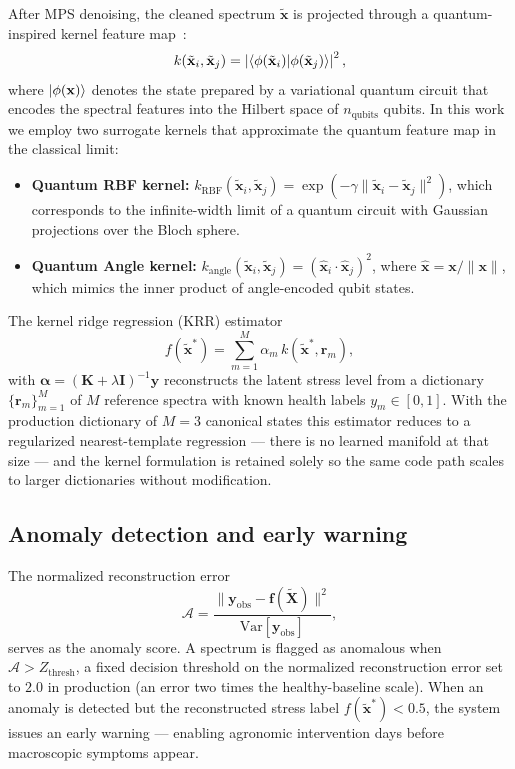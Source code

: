 \documentclass[11pt,a4paper]{article}
\begin{document}
After MPS denoising, the cleaned spectrum $\tilde{\mathbf{x}}$ is projected through a quantum-inspired kernel feature map~\cite{Havlicek2019}:
\begin{equation}\label{eq:SI_quantum_kernel}
k(\tilde{\mathbf{x}}_i, \tilde{\mathbf{x}}_j) = \left| \braket{\phi(\tilde{\mathbf{x}}_i)}{\phi(\tilde{\mathbf{x}}_j)} \right|^2,
\end{equation}
where $\ket{\phi(\mathbf{x})}$ denotes the state prepared by a variational quantum circuit that encodes the spectral features into the Hilbert space of $n_{\mathrm{qubits}}$ qubits. In this work we employ two surrogate kernels that approximate the quantum feature map in the classical limit:
\begin{itemize}
\item \textbf{Quantum RBF kernel:} $k_{\mathrm{RBF}}(\tilde{\mathbf{x}}_i, \tilde{\mathbf{x}}_j) = \exp(-\gamma \|\tilde{\mathbf{x}}_i - \tilde{\mathbf{x}}_j\|^2)$, which corresponds to the infinite-width limit of a quantum circuit with Gaussian projections over the Bloch sphere.
\item \textbf{Quantum Angle kernel:} $k_{\mathrm{angle}}(\tilde{\mathbf{x}}_i, \tilde{\mathbf{x}}_j) = (\hat{\mathbf{x}}_i \cdot \hat{\mathbf{x}}_j)^2$, where $\hat{\mathbf{x}} = \mathbf{x} / \|\mathbf{x}\|$, which mimics the inner product of angle-encoded qubit states.
\end{itemize}
The kernel ridge regression (KRR) estimator
\begin{equation}\label{eq:SI_krr}
f(\tilde{\mathbf{x}}^*) = \sum_{m=1}^{M} \alpha_m\, k(\tilde{\mathbf{x}}^*, \mathbf{r}_m),
\end{equation}
with $\boldsymbol{\alpha} = (\mathbf{K} + \lambda \mathbf{I})^{-1} \mathbf{y}$ reconstructs the latent stress level from a dictionary $\{\mathbf{r}_m\}_{m=1}^M$ of $M$ reference spectra with known health labels $y_m \in [0, 1]$. With the production dictionary of $M = 3$ canonical states this estimator reduces to a regularized nearest-template regression --- there is no learned manifold at that size --- and the kernel formulation is retained solely so the same code path scales to larger dictionaries without modification.

\subsection{Anomaly detection and early warning}

The normalized reconstruction error
\begin{equation}\label{eq:SI_anomaly_score}
\mathcal{A} = \frac{\|\mathbf{y}_{\mathrm{obs}} - \mathbf{f}(\tilde{\mathbf{X}})\|^2}{\mathrm{Var}[\mathbf{y}_{\mathrm{obs}}]},
\end{equation}
serves as the anomaly score. A spectrum is flagged as anomalous when $\mathcal{A} > Z_{\mathrm{thresh}}$, a fixed decision threshold on the normalized reconstruction error set to $2.0$ in production (an error two times the healthy-baseline scale). When an anomaly is detected but the reconstructed stress label $f(\tilde{\mathbf{x}}^*) < 0.5$, the system issues an early warning --- enabling agronomic intervention days before macroscopic symptoms appear.
\end{document}
